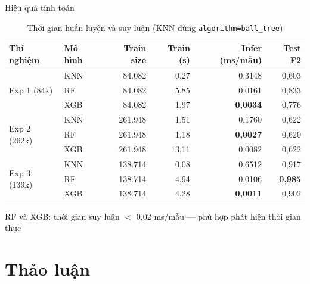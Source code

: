\documentclass[aspectratio=169,12pt]{beamer}
\newcommand{\good}[1]{\textcolor{mygreen}{\textbf{#1}}}
\newcommand{\sidenote}[1]{\textcolor{mygray}{\small #1}}
\begin{document}
\begin{frame}{Hiệu quả tính toán}
  \begin{table}
    \centering
    \small
    \caption{Thời gian huấn luyện và suy luận (KNN dùng \texttt{algorithm=ball\_tree})}
    \begin{tabular}{llrrrr}
      \toprule
      \textbf{Thí nghiệm} & \textbf{Mô hình} & \textbf{Train size} & \textbf{Train (s)} & \textbf{Infer (ms/mẫu)} & \textbf{Test F2}\\
      \midrule
      \multirow{3}{*}{Exp 1 (84k)}
        & KNN  & 84.082  & 0,27  & 0,3148 & 0,603 \\
        & RF   & 84.082  & 5,85  & 0,0161 & 0,833 \\
        & XGB  & 84.082  & 1,97  & \good{0,0034} & 0,776 \\
      \midrule
      \multirow{3}{*}{Exp 2 (262k)}
        & KNN  & 261.948 & 1,51  & 0,1760 & 0,622 \\
        & RF   & 261.948 & 1,18  & \good{0,0027} & 0,620 \\
        & XGB  & 261.948 & 13,11 & 0,0082 & 0,622 \\
      \midrule
      \multirow{3}{*}{Exp 3 (139k)}
        & KNN  & 138.714 & 0,08  & 0,6512 & 0,917 \\
        & RF   & 138.714 & 4,94  & 0,0106 & \good{0,985} \\
        & XGB  & 138.714 & 4,28  & \good{0,0011} & 0,902 \\
      \bottomrule
    \end{tabular}
  \end{table}
  \vspace{0.2em}
  \sidenote{RF và XGB: thời gian suy luận $<$ 0,02 ms/mẫu --- phù hợp phát hiện thời gian thực}
\end{frame}

\section{Thảo luận}
\end{document}
